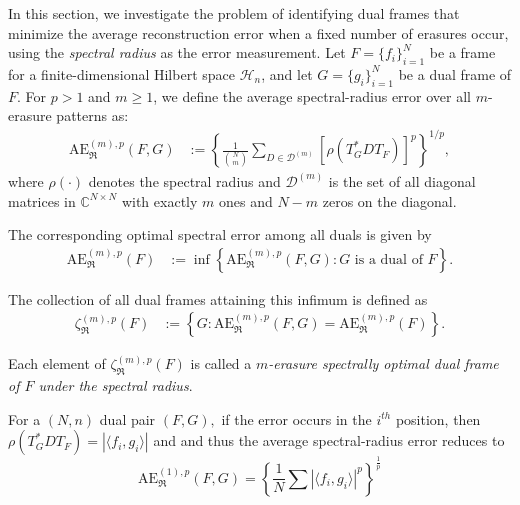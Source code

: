 \documentclass[final,1p,times]{elsarticle}
\newtheorem{lem}[thm]{Lemma}
\begin{document}
\noindent In this section, we investigate the problem of identifying dual frames that minimize the average reconstruction error when a fixed number of erasures occur, using the \textit{spectral radius} as the error measurement. Let $F = \{f_i\}_{i=1}^N$ be a frame for a finite-dimensional Hilbert space $\mathcal{H}_n$, and let $G = \{g_i\}_{i=1}^N$ be a dual frame of $F$. For $p > 1$ and $m \geq 1$, we define the average spectral-radius error over all $m$-erasure patterns as:
\begin{align*}
\mathrm{AE}_{\mathfrak{R}}^{(m),p}(F, G) 
&:= \left\{ \frac{1}{\binom{N}{m}} \sum\limits_{D \in \mathcal{D}^{(m)}} \left[ \rho\left( T_G^* D T_F \right) \right]^p \right\}^{1/p},
\end{align*}
where $\rho(\cdot)$ denotes the spectral radius and $\mathcal{D}^{(m)}$ is the set of all diagonal matrices in $\mathbb{C}^{N \times N}$ with exactly $m$ ones and $N-m$ zeros on the diagonal.

The corresponding optimal spectral error among all duals is given by
\begin{align*}
\mathrm{AE}_{\mathfrak{R}}^{(m),p}(F) 
&:= \inf \left\{ \mathrm{AE}_{\mathfrak{R}}^{(m),p}(F, G) : G \text{ is a dual of } F \right\}.
\end{align*}

The collection of all dual frames attaining this infimum is defined as
\begin{align*}
\zeta_{\mathfrak{R}}^{(m),p}(F) 
&:= \left\{ G : \mathrm{AE}_{\mathfrak{R}}^{(m),p}(F, G) = \mathrm{AE}_{\mathfrak{R}}^{(m),p}(F) \right\}.
\end{align*}

Each element of $\zeta_{\mathfrak{R}}^{(m),p}(F)$ is called a \textit{$m$-erasure spectrally optimal dual frame of $F$ under the spectral radius}.

\noindent \noindent
For a $(N,n)$ dual pair $(F,G),$ if the error occurs in the $i^{th}$ position, then $\rho\left(T_{G}^*DT_{F}\right) = \left|\langle f_i, g_i \rangle \right| $ and and thus the average spectral-radius error reduces to
	\begin{equation}\label{equation2}
		\mathrm{AE}_{\mathfrak{R}}^{(1),p} (F,G) = \left\{\frac{1}{N} \sum \left|\langle f_i, g_i \rangle \right|^p\right\}^{\frac{1}{p}}
	\end{equation}



\end{document}
